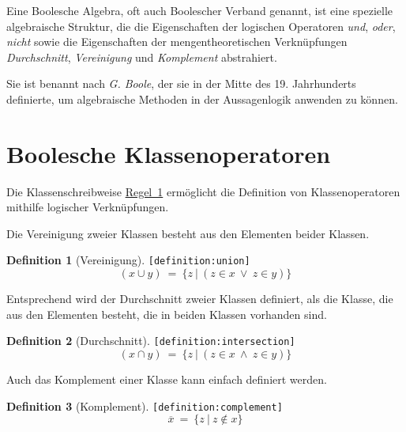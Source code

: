 \documentclass[a4paper,german,10pt,twoside]{book}
\theoremstyle{definition}
\newtheorem{defn}{Definition}
\theoremstyle{remark}
\begin{document}
Eine Boolesche Algebra, oft auch Boolescher Verband genannt, ist eine spezielle algebraische
Struktur, die die Eigenschaften der logischen Operatoren \emph{und}, \emph{oder}, \emph{nicht}
sowie die Eigenschaften der mengentheoretischen Verkn{\"u}pfungen \emph{Durchschnitt},
\emph{Vereinigung} und \emph{Komplement} abstrahiert.

\par
Sie ist benannt nach \emph{G. Boole}, der sie in der Mitte des 19. Jahrhunderts definierte, um
algebraische Methoden in der Aussagenlogik anwenden zu k{\"o}nnen.

\section{Boolesche Klassenoperatoren} \label{chapter4_section1} \hypertarget{chapter4_section1}{}
Die Klassenschreibweise \hyperlink{rule:classDefinition}{Regel~1} erm{\"o}glicht die Definition von Klassenoperatoren mithilfe
logischer Verkn{\"u}pfungen.

\par
Die Vereinigung zweier Klassen besteht aus den Elementen beider Klassen.

\begin{defn}[Vereinigung]
\label{definition:union} \hypertarget{definition:union}{}
{\tt \tiny [\verb]definition:union]]}
$$(x \cup y) \ = \ \{ z \ | \ (z \in x\ \lor\ z \in y) \} $$
\end{defn}


\par
Entsprechend wird der Durchschnitt zweier Klassen definiert, als die Klasse, die aus den Elementen besteht, die in beiden Klassen vorhanden sind.

\begin{defn}[Durchschnitt]
\label{definition:intersection} \hypertarget{definition:intersection}{}
{\tt \tiny [\verb]definition:intersection]]}
$$(x \cap y) \ = \ \{ z \ | \ (z \in x\ \land\ z \in y) \} $$
\end{defn}


\par
Auch das Komplement einer Klasse kann einfach definiert werden.

\begin{defn}[Komplement]
\label{definition:complement} \hypertarget{definition:complement}{}
{\tt \tiny [\verb]definition:complement]]}
$$\overline{x} \ = \ \{ z \ | \ z \notin x \} $$
\end{defn}
\end{document}
